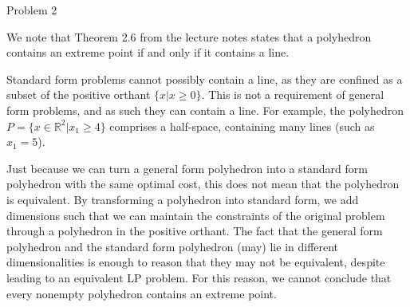 \documentclass[11pt]{article}
\begin{document}
Problem 2

We note that Theorem 2.6 from the lecture notes states that a polyhedron contains an extreme point if and only if it contains a line.

Standard form problems cannot possibly contain a line, as they are confined as a subset of the positive orthant $\{x|x\geq 0\}$. This is not a requirement of general form problems, and as such they can contain a line. For example, the polyhedron $P=\{x\in\mathbb{R}^2|x_1\geq 4\}$ comprises a half-space, containing many lines (such as $x_1=5$).

Just because we can turn a general form polyhedron into a standard form polyhedron with the same optimal cost, this does not mean that the polyhedron is equivalent. By transforming a polyhedron into standard form, we add dimensions such that we can maintain the constraints of the original problem through a polyhedron in the positive orthant. The fact that the general form polyhedron and the standard form polyhedron (may) lie in different dimensionalities is enough to reason that they may not be equivalent, despite leading to an equivalent LP problem. For this reason, we cannot conclude that every nonempty polyhedron contains an extreme point.
\end{document}
